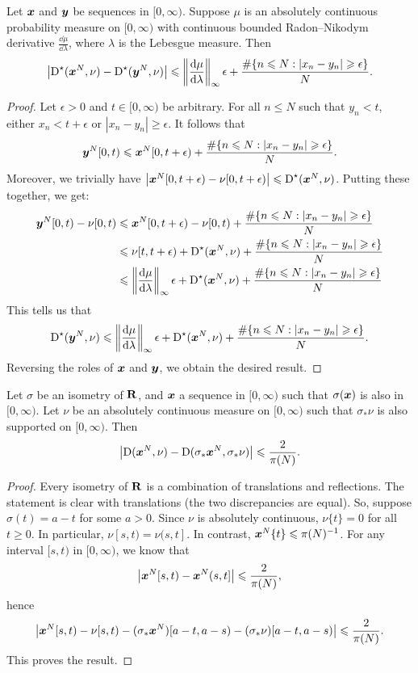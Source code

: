 \begin{lemma}\label{lem:disc-of-two-seq}
Let ${\boldsymbol x}$ and ${\boldsymbol y}$ be sequences in $[0,\infty)$. Suppose $\mu$ is an 
absolutely continuous probability measure on $[0,\infty)$ with continuous 
bounded Radon--Nikodym derivative $\frac{\dd \mu}{\dd\lambda}$, where 
$\lambda$ is the Lebesgue measure. Then 
\[
	\left|\operatorname{D}^\star({\boldsymbol x}^N, \nu) - \operatorname{D}^\star({\boldsymbol y}^N,\nu)\right| \leqslant \left\|\frac{\mathrm{d}\mu}{\mathrm{d}\lambda}\right\|_\infty \epsilon + \frac{\#\{ n\leqslant N : |x_n - y_n| \geqslant \epsilon\}}{N} .
\]
\end{lemma}
\begin{proof}
Let $\epsilon>0$ and $t\in [0,\infty)$ be arbitrary. For all $n\leqslant N$ 
such that $y_n<t$, either $x_n < t+\epsilon$ or 
$|x_n - y_n| \geqslant \epsilon$. It follows that 
\[
	{\boldsymbol y}^N[0,t) \leqslant {\boldsymbol x}^N[0,t+\epsilon) + \frac{\#\{ n\leqslant N : |x_n - y_n| \geqslant \epsilon\}}{N} .
\]
Moreover, we trivially have 
$\left| {\boldsymbol x}^N[0,t+\epsilon) - \nu[0,t+\epsilon)\right| \leqslant \operatorname{D}^\star({\boldsymbol x}^N,\nu)$. Putting these together, we get: 
\begin{align*}
	{\boldsymbol y}^N[0,t) - \nu[0,t) 
		&\leqslant {\boldsymbol x}^N[0,t+\epsilon) - \nu[0,t) + \frac{\#\{ n\leqslant N : |x_n - y_n| \geqslant \epsilon\}}{N} \\
		&\leqslant \nu[t,t+\epsilon) + \operatorname{D}^\star({\boldsymbol x}^N,\nu) + \frac{\#\{ n\leqslant N : |x_n - y_n| \geqslant \epsilon\}}{N} \\
		&\leqslant \left\|\frac{\mathrm{d}\mu}{\mathrm{d}\lambda}\right\|_\infty \epsilon + \operatorname{D}^\star({\boldsymbol x}^N,\nu) + \frac{\#\{ n\leqslant N : |x_n - y_n| \geqslant \epsilon\}}{N} 
\end{align*}
This tells us that 
\[
	\operatorname{D}^\star({\boldsymbol y}^N,\nu) \leqslant \left\|\frac{\mathrm{d}\mu}{\mathrm{d}\lambda}\right\|_\infty \epsilon + \operatorname{D}^\star({\boldsymbol x}^N,\nu) + \frac{\#\{ n\leqslant N : |x_n - y_n| \geqslant \epsilon\}}{N} .
\]
Reversing the roles of ${\boldsymbol x}$ and ${\boldsymbol y}$, we obtain the desired result. 
\end{proof}

\begin{lemma}\label{lem:flip-discrepancy}
Let $\sigma$ be an isometry of $\mathbf{R}$, and ${\boldsymbol x}$ a sequence in $[0,\infty)$ 
such that $\sigma({\boldsymbol x})$ is also in $[0,\infty)$. Let $\nu$ be an absolutely 
continuous measure on $[0,\infty)$ such that $\sigma_\ast \nu$ is also 
supported on $[0,\infty)$. Then 
\[
	\left|\operatorname{D}({\boldsymbol x}^N, \nu) - \operatorname{D}(\sigma_\ast {\boldsymbol x}^N, \sigma_\ast \nu)\right| \leqslant \frac{2}{\pi(N)} .
\]
\end{lemma}
\begin{proof}
Every isometry of $\mathbf{R}$ is a combination of translations and reflections. 
The statement is clear with translations (the two discrepancies are equal). So, 
suppose $\sigma(t) = a - t$ for some $a>0$. Since $\nu$ is absolutely 
continuous, $\nu\{t\}=0$ for all $t\geqslant 0$. In particular, 
$\nu[s,t) = \nu(s,t]$. In contrast, ${\boldsymbol x}^N\{t\}\leqslant \pi(N)^{-1}$. For any 
interval $[s,t)$ in $[0,\infty)$, we know that 
\[
	\left| {\boldsymbol x}^N[s,t) - {\boldsymbol x}^N(s,t]\right| \leqslant \frac{2}{\pi(N)}  ,
\]
hence 
\[
	\left| {\boldsymbol x}^N[s,t) - \nu[s,t) - (\sigma_\ast {\boldsymbol x}^N)[a-t,a-s) - (\sigma_\ast \nu)[a-t,a-s)\right| \leqslant \frac{2}{\pi(N)} .
\]
This proves the result. 
\end{proof}

